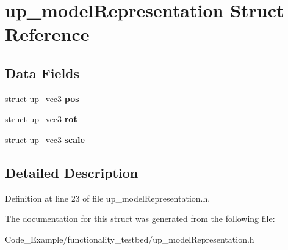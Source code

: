 \hypertarget{structup__model_representation}{}\section{up\+\_\+model\+Representation Struct Reference}
\label{structup__model_representation}
\subsection*{Data Fields}
\begin{DoxyCompactItemize}
\item 
\hypertarget{structup__model_representation_ad5e9d1040f4ef4fbe488b7078c16ee97}{}struct \hyperlink{structup__vec3}{up\+\_\+vec3} {\bfseries pos}\label{structup__model_representation_ad5e9d1040f4ef4fbe488b7078c16ee97}

\item 
\hypertarget{structup__model_representation_a2f43d1a5fad0ee8dde70152012c725f2}{}struct \hyperlink{structup__vec3}{up\+\_\+vec3} {\bfseries rot}\label{structup__model_representation_a2f43d1a5fad0ee8dde70152012c725f2}

\item 
\hypertarget{structup__model_representation_a952b0863ccd5d40e3aaafe3d2c83a633}{}struct \hyperlink{structup__vec3}{up\+\_\+vec3} {\bfseries scale}\label{structup__model_representation_a952b0863ccd5d40e3aaafe3d2c83a633}

\end{DoxyCompactItemize}


\subsection{Detailed Description}


Definition at line 23 of file up\+\_\+model\+Representation.\+h.



The documentation for this struct was generated from the following file\+:\begin{DoxyCompactItemize}
\item 
Code\+\_\+\+Example/functionality\+\_\+testbed/up\+\_\+model\+Representation.\+h\end{DoxyCompactItemize}
